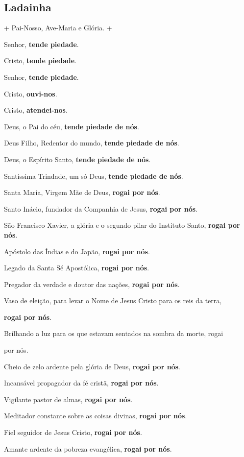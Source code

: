\documentclass[11pt]{article}
\begin{document}
\subsection{Ladainha}
\begin{justify}
+ Pai-Nosso, Ave-Maria e Glória. +

Senhor, \textbf{tende piedade}.

Cristo, \textbf{tende piedade}.

Senhor, \textbf{tende piedade}.

Cristo, \textbf{ouvi-nos}.

Cristo, \textbf{atendei-nos}.

Deus, o Pai do céu, \textbf{tende piedade de nós}.

Deus Filho, Redentor do mundo, \textbf{tende piedade de nós}.

Deus, o Espírito Santo, \textbf{tende piedade de nós}.

 Santíssima Trindade, um só Deus, \textbf{tende piedade de nós}.

Santa Maria, Virgem Mãe de Deus, \textbf{rogai por nós}.

Santo Inácio, fundador da Companhia de Jesus, \textbf{rogai por nós}.

São Francisco Xavier, a glória e o segundo pilar do Instituto Santo, \textbf{rogai por nós}.

Apóstolo das Índias e do Japão, \textbf{rogai por nós}.

Legado da Santa Sé Apostólica, \textbf{rogai por nós}.

Pregador da verdade e doutor das nações, \textbf{rogai por nós}.

Vaso de eleição, para levar o Nome de Jesus Cristo para os reis da terra,

\textbf{rogai por nós}.

Brilhando a luz para os que estavam sentados na sombra da morte, rogai

por nós.

Cheio de zelo ardente pela glória de Deus, \textbf{rogai por nós}.

Incansável propagador da fé cristã, \textbf{rogai por nós}.

Vigilante pastor de almas, \textbf{rogai por nós}.

Meditador constante sobre as coisas divinas, \textbf{rogai por nós}.

Fiel seguidor de Jesus Cristo, \textbf{rogai por nós}.

Amante ardente da pobreza evangélica, \textbf{rogai por nós}.


\end{justify}
\end{document}
